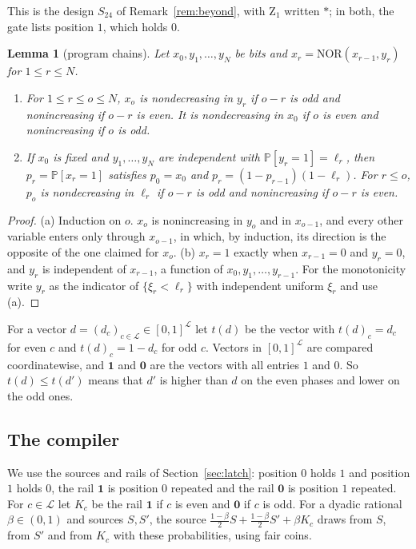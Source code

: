 \documentclass[11pt]{amsart}
\newtheorem{lemma}[theorem]{Lemma}
\theoremstyle{definition}
\theoremstyle{remark}
\newcommand{\NOR}{\mathrm{NOR}}
\newcommand{\PP}{\mathbb{P}}
\begin{document}
\noindent This is the design $S_{24}$ of Remark~\ref{rem:beyond}, with $\mathrm Z_1$ written $\ast$;
in both, the gate lists position $1$, which holds $0$.

\begin{lemma}[program chains]\label{lem:progchain}
Let $x_0,y_1,\dots,y_N$ be bits and $x_r=\NOR(x_{r-1},y_r)$ for $1\le r\le N$.
\begin{enumerate}[label=(\alph*),leftmargin=2.4em]
\item For $1\le r\le o\le N$, $x_o$ is nondecreasing in $y_r$ if $o-r$ is odd and nonincreasing if
$o-r$ is even. It is nondecreasing in $x_0$ if $o$ is even and nonincreasing if $o$ is odd.
\item If $x_0$ is fixed and $y_1,\dots,y_N$ are independent with $\PP[y_r=1]=\ell_r$, then
$p_r=\PP[x_r=1]$ satisfies $p_0=x_0$ and $p_r=(1-p_{r-1})(1-\ell_r)$. For $r\le o$, $p_o$ is
nondecreasing in $\ell_r$ if $o-r$ is odd and nonincreasing if $o-r$ is even.
\end{enumerate}
\end{lemma}

\begin{proof}
(a) Induction on $o$. $x_o$ is nonincreasing in $y_o$ and in $x_{o-1}$, and every other variable
enters only through $x_{o-1}$, in which, by induction, its direction is the opposite of the one
claimed for $x_o$. (b) $x_r=1$ exactly when $x_{r-1}=0$ and $y_r=0$, and $y_r$ is independent of
$x_{r-1}$, a function of $x_0,y_1,\dots,y_{r-1}$. For the monotonicity write $y_r$ as the
indicator of $\{\xi_r<\ell_r\}$ with independent uniform $\xi_r$ and use (a).
\end{proof}

For a vector $d=(d_c)_{c\in\mathcal L}\in[0,1]^\mathcal L$ let $t(d)$ be the vector with $t(d)_c=d_c$ for
even $c$ and $t(d)_c=1-d_c$ for odd $c$. Vectors in $[0,1]^\mathcal L$ are compared coordinatewise, and
$\mathbf 1$ and $\mathbf 0$ are the vectors with all entries $1$ and $0$. So $t(d)\le t(d')$ means
that $d'$ is higher than $d$ on the even phases and lower on the odd ones.

\subsection{The compiler}

We use the sources and rails of Section~\ref{sec:latch}: position $0$ holds $1$ and position $1$
holds $0$, the rail $\mathbf 1$ is position $0$ repeated and the rail $\mathbf 0$ is position $1$
repeated. For $c\in\mathcal L$ let $K_c$ be the rail $\mathbf 1$ if $c$ is even and $\mathbf 0$ if $c$
is odd. For a dyadic rational $\beta\in(0,1)$ and sources $S,S'$, the source
$\frac{1-\beta}2S+\frac{1-\beta}2S'+\beta K_c$ draws from $S$, from $S'$ and from $K_c$ with these
probabilities, using fair coins.
\end{document}
